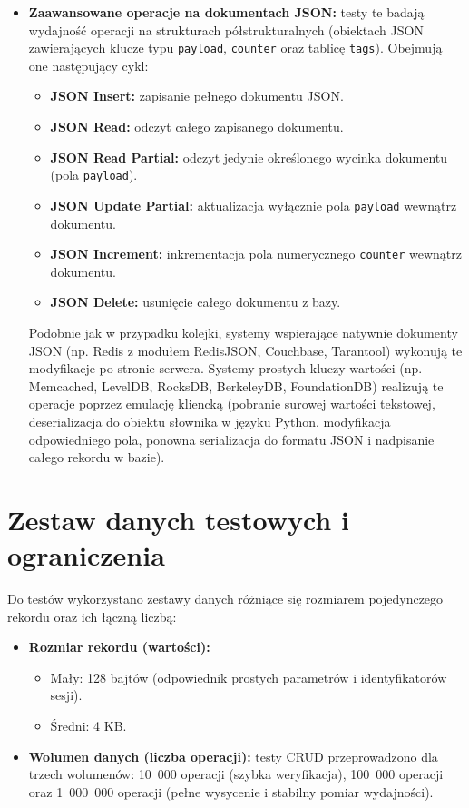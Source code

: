 \begin{itemize}
    Dla baz serwerowych o bogatej strukturze typów danych (np. Redis) operacja ta jest realizowana natywnie przy użyciu wbudowanych instrukcji listowych (np. \texttt{rpush} i \texttt{lpop}). Dla pozostałych systemów operacja ta jest emulowana programowo po stronie aplikacji w języku Python.
    \item \textbf{Zaawansowane operacje na dokumentach JSON:} testy te badają wydajność operacji na strukturach półstrukturalnych (obiektach JSON zawierających klucze typu \texttt{payload}, \texttt{counter} oraz tablicę \texttt{tags}). Obejmują one następujący cykl:
    \begin{itemize}
        \item \textbf{JSON Insert:} zapisanie pełnego dokumentu JSON.
        \item \textbf{JSON Read:} odczyt całego zapisanego dokumentu.
        \item \textbf{JSON Read Partial:} odczyt jedynie określonego wycinka dokumentu (pola \texttt{payload}).
        \item \textbf{JSON Update Partial:} aktualizacja wyłącznie pola \texttt{payload} wewnątrz dokumentu.
        \item \textbf{JSON Increment:} inkrementacja pola numerycznego \texttt{counter} wewnątrz dokumentu.
        \item \textbf{JSON Delete:} usunięcie całego dokumentu z bazy.
    \end{itemize}
    Podobnie jak w przypadku kolejki, systemy wspierające natywnie dokumenty JSON (np. Redis z modułem RedisJSON, Couchbase, Tarantool) wykonują te modyfikacje po stronie serwera. Systemy prostych kluczy-wartości (np. Memcached, LevelDB, RocksDB, BerkeleyDB, FoundationDB) realizują te operacje poprzez emulację kliencką (pobranie surowej wartości tekstowej, deserializacja do obiektu słownika w języku Python, modyfikacja odpowiedniego pola, ponowna serializacja do formatu JSON i nadpisanie całego rekordu w bazie).
\end{itemize}

\section{Zestaw danych testowych i ograniczenia}
Do testów wykorzystano zestawy danych różniące się rozmiarem pojedynczego rekordu oraz ich łączną liczbą:
\begin{itemize}
    \item \textbf{Rozmiar rekordu (wartości):}
    \begin{itemize}
        \item Mały: 128 bajtów (odpowiednik prostych parametrów i identyfikatorów sesji).
        \item Średni: 4 KB.
    \end{itemize}
    \item \textbf{Wolumen danych (liczba operacji):} testy CRUD przeprowadzono dla trzech wolumenów: 10~000 operacji (szybka weryfikacja), 100~000 operacji oraz 1~000~000 operacji (pełne wysycenie i stabilny pomiar wydajności).
\end{itemize}

